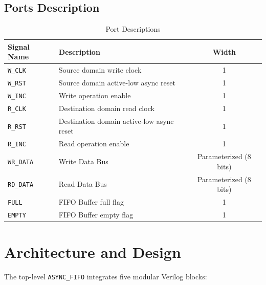 \documentclass[12pt,a4paper]{article}
\begin{document}
\subsection{Ports Description}
\begin{table}[H]
\centering
\begin{tabular}{@{}llc@{}}
\toprule
\textbf{Signal Name} & \textbf{Description} & \textbf{Width} \\
\midrule
\texttt{W\_CLK}   & Source domain write clock               & 1 \\
\texttt{W\_RST}   & Source domain active-low async reset    & 1 \\
\texttt{W\_INC}   & Write operation enable                  & 1 \\
\texttt{R\_CLK}   & Destination domain read clock          & 1 \\
\texttt{R\_RST}   & Destination domain active-low async reset & 1 \\
\texttt{R\_INC}   & Read operation enable                   & 1 \\
\texttt{WR\_DATA} & Write Data Bus                          & Parameterized (8 bits) \\
\texttt{RD\_DATA} & Read Data Bus                           & Parameterized (8 bits) \\
\texttt{FULL}     & FIFO Buffer full flag                   & 1 \\
\texttt{EMPTY}    & FIFO Buffer empty flag                  & 1 \\
\bottomrule
\end{tabular}
\caption{Port Descriptions}
\end{table}

\section{Architecture and Design}

The top-level \texttt{ASYNC\_FIFO} integrates five modular Verilog blocks:
\end{document}
